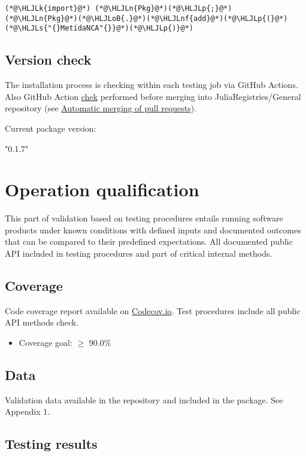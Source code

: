 \documentclass[12pt,a4paper]{article}
\newcommand{\HLJLk}[1]{\textcolor[RGB]{148,91,176}{\textbf{#1}}}
\newcommand{\HLJLn}[1]{#1}
\newcommand{\HLJLnf}[1]{\textcolor[RGB]{66,102,213}{#1}}
\newcommand{\HLJLs}[1]{\textcolor[RGB]{201,61,57}{#1}}
\newcommand{\HLJLoB}[1]{\textcolor[RGB]{102,102,102}{\textbf{#1}}}
\newcommand{\HLJLp}[1]{#1}
\begin{document}
\begin{lstlisting}
(*@\HLJLk{import}@*) (*@\HLJLn{Pkg}@*)(*@\HLJLp{;}@*) (*@\HLJLn{Pkg}@*)(*@\HLJLoB{.}@*)(*@\HLJLnf{add}@*)(*@\HLJLp{(}@*)(*@\HLJLs{"{}MetidaNCA"{}}@*)(*@\HLJLp{)}@*)
\end{lstlisting}

\subsection{Version check}
The installation process is checking within each testing job via GitHub Actions. Also GitHub Action \href{https://github.com/JuliaRegistries/General/blob/master/.github/workflows/automerge.yml}{chek} performed before merging into JuliaRegistries/General repository (see \href{https://github.com/JuliaRegistries/General#automatic-merging-of-pull-requests}{Automatic merging of pull requests}).



Current package version:


"0.1.7"


\section{Operation qualification}
This part of validation based on testing procedures entails running software products under known conditions with defined inputs and documented outcomes that can be compared to their predefined expectations. All documented public API included in testing procedures and part of critical internal methods.

\subsection{Coverage}
Code coverage report available on \href{https://app.codecov.io/gh/PharmCat/MetidaNCA.jl}{Codecov.io}. Test procedures include all  public API methods check.

\begin{itemize}
\item Coverage goal: \ensuremath{\geq} 90.0\%

\end{itemize}
\subsection{Data}
Validation data available in the repository and included in the package. See Appendix 1.

\subsection{Testing results}
\end{document}
